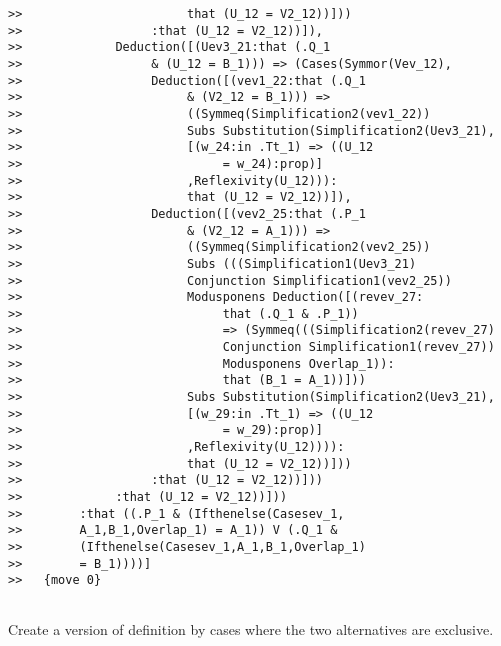 \documentclass[12pt]{article}
\begin{document}
\begin{verbatim}
>>                       that (U_12 = V2_12))]))
>>                  :that (U_12 = V2_12))]),
>>             Deduction([(Uev3_21:that (.Q_1 
>>                  & (U_12 = B_1))) => (Cases(Symmor(Vev_12),
>>                  Deduction([(vev1_22:that (.Q_1 
>>                       & (V2_12 = B_1))) => 
>>                       ((Symmeq(Simplification2(vev1_22)) 
>>                       Subs Substitution(Simplification2(Uev3_21),
>>                       [(w_24:in .Tt_1) => ((U_12 
>>                            = w_24):prop)]
>>                       ,Reflexivity(U_12))):
>>                       that (U_12 = V2_12))]),
>>                  Deduction([(vev2_25:that (.P_1 
>>                       & (V2_12 = A_1))) => 
>>                       ((Symmeq(Simplification2(vev2_25)) 
>>                       Subs (((Simplification1(Uev3_21) 
>>                       Conjunction Simplification1(vev2_25)) 
>>                       Modusponens Deduction([(revev_27:
>>                            that (.Q_1 & .P_1)) 
>>                            => (Symmeq(((Simplification2(revev_27) 
>>                            Conjunction Simplification1(revev_27)) 
>>                            Modusponens Overlap_1)):
>>                            that (B_1 = A_1))]))
>>                       Subs Substitution(Simplification2(Uev3_21),
>>                       [(w_29:in .Tt_1) => ((U_12 
>>                            = w_29):prop)]
>>                       ,Reflexivity(U_12)))):
>>                       that (U_12 = V2_12))]))
>>                  :that (U_12 = V2_12))]))
>>             :that (U_12 = V2_12))]))
>>        :that ((.P_1 & (Ifthenelse(Casesev_1,
>>        A_1,B_1,Overlap_1) = A_1)) V (.Q_1 & 
>>        (Ifthenelse(Casesev_1,A_1,B_1,Overlap_1) 
>>        = B_1))))]
>>   {move 0}


\end{verbatim}

Create a version of definition by cases where the two alternatives are exclusive.
\end{document}
